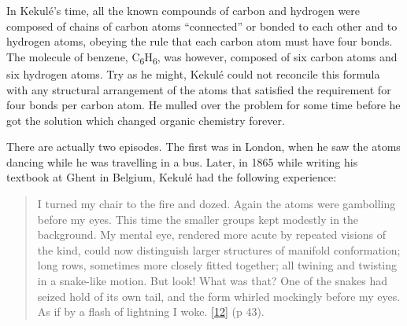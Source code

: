 \documentclass[
  12pt,
  british,
  a4paper,
  rgb,
  dvipsnames,
  svgnames,
  hyphens]{article}
\begin{document}
In Kekulé's time, all the known compounds of carbon and hydrogen were
composed of chains of carbon atoms ``connected'' or bonded to each other
and to hydrogen atoms, obeying the rule that each carbon atom must have
four bonds. The molecule of benzene,
C\textsubscript{6}H\textsubscript{6}, was however, composed of six
carbon atoms and six hydrogen atoms. Try as he might, Kekulé could not
reconcile this formula with any structural arrangement of the atoms that
satisfied the requirement for four bonds per carbon atom. He mulled over
the problem for some time before he got the solution which changed
organic chemistry forever.

There are actually two episodes. The first was in London, when he saw
the atoms dancing while he was travelling in a bus. Later, in 1865 while
writing his textbook at Ghent in Belgium, Kekulé had the following
experience:

\begin{quote}
I turned my chair to the fire and dozed. Again the atoms were gambolling
before my eyes. This time the smaller groups kept modestly in the
background. My mental eye, rendered more acute by repeated visions of
the kind, could now distinguish larger structures of manifold
conformation; long rows, sometimes more closely fitted together; all
twining and twisting in a snake-like motion. But look! What was that?
One of the snakes had seized hold of its own tail, and the form whirled
mockingly before my eyes. As if by a flash of lightning I woke.
\protect\hyperlink{ref-findlay37}{{[}12{]}} (p 43).
\end{quote}
\end{document}
